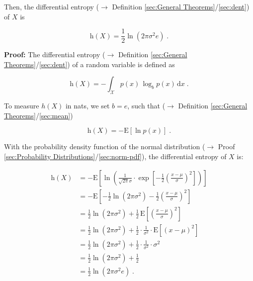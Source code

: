 \documentclass[a4paper,12pt,twoside]{book}
\begin{document}
Then, the differential entropy ($\rightarrow$ Definition \ref{sec:General Theorems}/\ref{sec:dent}) of $X$ is

\begin{equation} \label{eq:norm-dent-norm-dent}
\mathrm{h}(X) = \frac{1}{2} \ln\left( 2 \pi \sigma^2 e \right) \; .
\end{equation}

\vspace{1em}
\textbf{Proof:} The differential entropy ($\rightarrow$ Definition \ref{sec:General Theorems}/\ref{sec:dent}) of a random variable is defined as

\begin{equation} \label{eq:norm-dent-dent}
\mathrm{h}(X) = - \int_{\mathcal{X}} p(x) \, \log_b p(x) \, \mathrm{d}x \; .
\end{equation}

To measure $h(X)$ in nats, we set $b = e$, such that ($\rightarrow$ Definition \ref{sec:General Theorems}/\ref{sec:mean})

\begin{equation} \label{eq:norm-dent-dent-nats}
\mathrm{h}(X) = - \mathrm{E}\left[ \ln p(x) \right] \; .
\end{equation}

With the probability density function of the normal distribution ($\rightarrow$ Proof \ref{sec:Probability Distributions}/\ref{sec:norm-pdf}), the differential entropy of $X$ is:

\begin{equation} \label{eq:norm-dent-mvn-dent-s1}
\begin{split}
\mathrm{h}(X) &= - \mathrm{E}\left[ \ln \left( \frac{1}{\sqrt{2 \pi} \sigma} \cdot \exp \left[ -\frac{1}{2} \left( \frac{x-\mu}{\sigma} \right)^2 \right] \right) \right] \\
&= - \mathrm{E}\left[ - \frac{1}{2} \ln(2\pi\sigma^2) - \frac{1}{2} \left( \frac{x-\mu}{\sigma} \right)^2 \right] \\
&= \frac{1}{2} \ln(2 \pi \sigma^2) + \frac{1}{2} \, \mathrm{E}\left[ \left( \frac{x-\mu}{\sigma} \right)^2 \right] \\
&= \frac{1}{2} \ln(2 \pi \sigma^2) + \frac{1}{2} \cdot \frac{1}{\sigma^2} \cdot \mathrm{E}\left[ (x-\mu)^2 \right] \\
&= \frac{1}{2} \ln(2 \pi \sigma^2) + \frac{1}{2} \cdot \frac{1}{\sigma^2} \cdot \sigma^2 \\
&= \frac{1}{2} \ln(2 \pi \sigma^2) + \frac{1}{2} \\
&= \frac{1}{2} \ln(2 \pi \sigma^2 e) \; .
\end{split}
\end{equation}
\end{document}
